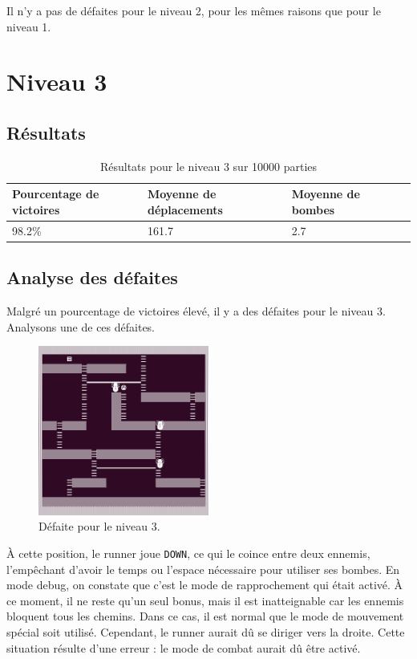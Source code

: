 Il n'y a pas de défaites pour le niveau 2, pour les mêmes raisons que pour le niveau 1.

\newpage

\section{Niveau 3}

\subsection{Résultats}

\begin{table}[!htpb]
    \begin{tabularx}{\textwidth}{lXXX}
        \toprule
        Pourcentage de victoires & Moyenne de déplacements & Moyenne de bombes \\
        \midrule
        98.2\% & 161.7 & 2.7 \\
        \bottomrule
    \end{tabularx}
    \caption{Résultats pour le niveau 3 sur 10000 parties}
    \label{tab:res-niveau-3}
\end{table}

\subsection{Analyse des défaites}

Malgré un pourcentage de victoires élevé, il y a des défaites pour le niveau 3.	Analysons une de ces défaites.

\begin{figure}[!htpb]
    \centering
    \includegraphics[width=0.5\textwidth]{Figures/level3-over.png}
    \caption{Défaite pour le niveau 3.}
    \label{fig:defaite-niveau-3}
\end{figure}

À cette position, le runner joue \texttt{DOWN}, ce qui le coince entre deux ennemis, l'empêchant d'avoir le temps ou l'espace nécessaire pour utiliser ses bombes. En mode debug, on constate que c'est le mode de rapprochement qui était activé.
\newline
À ce moment, il ne reste qu'un seul bonus, mais il est inatteignable car les ennemis bloquent tous les chemins. Dans ce cas, il est normal que le mode de mouvement spécial soit utilisé. Cependant, le runner aurait dû se diriger vers la droite.
\newline
Cette situation résulte d'une erreur : le mode de combat aurait dû être activé.

